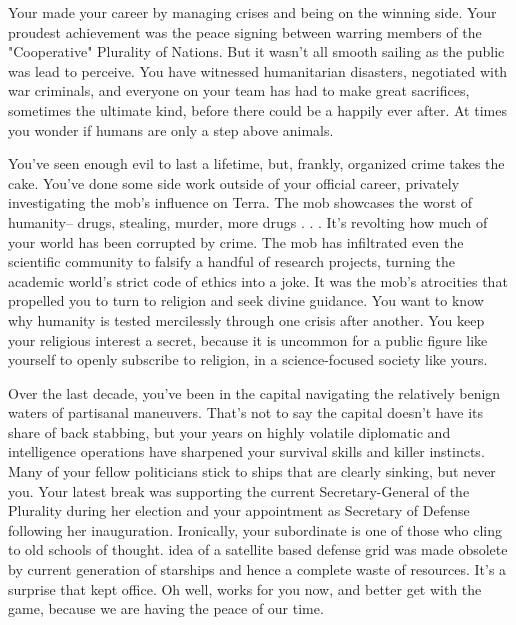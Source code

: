 \documentclass[char]{guildcamp3}
\begin{document}
\name{\cPoliOne{}}






Your made your career by managing crises and being on the winning side. Your proudest achievement was the peace signing between warring members of the "Cooperative" Plurality of Nations. But it wasn't all smooth sailing as the public was lead to perceive. You have witnessed humanitarian disasters, negotiated with war criminals, and everyone on your team has had to make great sacrifices, sometimes the ultimate kind, before there could be a happily ever after. At times you wonder if humans are only a step above animals. 

You've seen enough evil to last a lifetime, but, frankly, organized crime takes the cake. You've done some side work outside of your official career, privately investigating the mob's influence on Terra. The mob showcases the worst of humanity-- drugs, stealing, murder, more drugs . . . It's revolting how much of your world has been corrupted by crime. The mob has infiltrated even the scientific community to falsify a handful of research projects, turning the academic world's strict code of ethics into a joke. It was the mob's atrocities that propelled you to turn to religion and seek divine guidance. You want to know why humanity is tested mercilessly through one crisis after another. You keep your religious interest a secret, because it is uncommon for a public figure like yourself to openly subscribe to religion, in a science-focused society like yours. 

Over the last decade, you've been in the capital navigating the relatively benign waters of partisanal maneuvers. That's not to say the capital doesn't have its share of back stabbing, but your years on highly volatile diplomatic and intelligence operations have sharpened your survival skills and killer instincts. Many of your fellow politicians stick to ships that are clearly sinking, but never you. Your latest break was supporting the current Secretary-General of the Plurality during her election and your appointment as Secretary of Defense following her inauguration. Ironically, your subordinate \cPoliTwo{\intro} is one of those who cling to old schools of thought. \cPoliTwo{\Their} idea of a satellite based defense grid was made obsolete by current generation of starships and hence a complete waste of resources. It's a surprise that \cPoliTwo{\they} kept \cPoliTwo{\their} office. Oh well, \cPoliTwo{\they} works for you now, and  better get with the game, because we are having the peace of our time.
\end{document}
